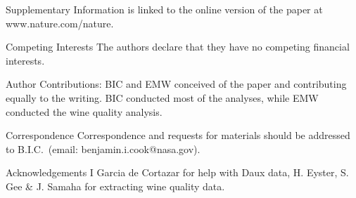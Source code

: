 \documentclass[final]{nature}
\begin{document}
\begin{addendum}
 \item [Supplementary Information] is linked to the online version of the paper at www.nature.com/nature.
 \item[Competing Interests] The authors declare that they have no
competing financial interests.
\item [Author Contributions:] BIC and EMW conceived of the paper and contributing equally to the writing. BIC conducted most of the analyses, while EMW conducted the wine quality analysis.
 \item[Correspondence] Correspondence and requests for materials
should be addressed to B.I.C.~(email: benjamin.i.cook@nasa.gov).
 \item[Acknowledgements] I Garcia de Cortazar for help with Daux data, H. Eyster, S. Gee \& J. Samaha for extracting wine quality data.
\end{addendum}
\end{document}
